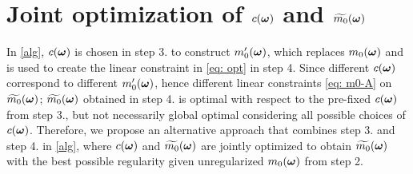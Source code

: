 \section{Joint optimization of $c(\boldsymbol{\omega})$ and $\widetilde{m_{0}}(\boldsymbol{\omega})$}\label{app: QCQP}

In \ref{alg}, $c(\boldsymbol{\omega})$ is chosen in step 3. to construct $m_0'(\boldsymbol{\omega})$, which replaces $m_0(\boldsymbol{\omega})$ and is used to create the linear constraint in \eqref{eq: opt} in step 4. Since different $c(\boldsymbol{\omega})$ correspond to different $m_0'(\boldsymbol{\omega})$, hence different linear constraints \eqref{eq: m0-A} on $\widetilde{m_{0}}(\boldsymbol{\omega})$; $\widetilde{m_{0}}(\boldsymbol{\omega})$ obtained in step 4. is optimal with respect to the pre-fixed $c(\boldsymbol{\omega})$ from step 3., but not necessarily global optimal considering all possible choices of $c(\boldsymbol{\omega})$. Therefore, we propose an alternative approach that combines step 3. and step 4. in \ref{alg}, where $c(\boldsymbol{\omega})$ and $\widetilde{m_{0}}(\boldsymbol{\omega})$ are jointly optimized to obtain $\widetilde{m_{0}}(\boldsymbol{\omega})$ with the best possible regularity given unregularized $m_0(\boldsymbol{\omega})$ from step 2.

